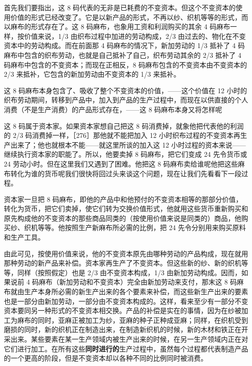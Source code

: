 首先我们要指出，这 8 码代表的无非是已耗费的不变资本。但这个不变资本的使用价值的形式已经改变了。它是以新产品的形式，不再以纱、织机等等的形式，而以麻布的形式存在了。这 8 码麻布，也象用工资和利润购买的其余 4 码麻布一样，按价值来说，1/3 由织布过程中加进的劳动构成，2/3 由过去的、物化在不变资本中的劳动构成。而在前面那 4 码麻布的情况下，新加劳动的 1/3 抵补了 4 码麻布中包含的织布劳动，也就是自己抵补了自己，织布劳动其余的 2/3 抵补了 4 码麻布中包含的不变资本；而现在正相反，8 码麻布包含的不变资本由不变资本的 2/3 来抵补，它包含的新加劳动由不变资本的 1/3 来抵补。

这 8 码麻布本身包含了、吸收了整个不变资本的价值，——这个价值在 12 小时的织布劳动期间，转移到产品中，加入到产品的生产过程中，而现在以供直接的个人消费（不是生产消费）的产品形式存在，——这 8 码麻布本身又将怎样呢

这 8 码属于资本家。如果资本家想自己把这 8 码消费掉，就象他把代表他的利润的 2/3 码消费掉一样，［276］那他就不能把加入 12 小时织布过程的不变资本再生产出来了；他也就根本不能——就这里所谈的加入这 12 小时过程的资本来说——继续执行资本家的职能了。所以，他要卖掉 8 码麻布，把它们变成 24 先令货币或 24 劳动小时。但在这里我们又遇到了困难。他把这 8 码麻布卖给谁呢他把这些麻布转化为谁的货币呢我们很快将回过头来谈这个问题，现在让我们先看看下一段过程。

资本家一旦把 8 码麻布，即他的产品中和他预付的不变资本相等的那部分价值，转化为货币，把它们卖掉，使它们转为交换价值形式，他就用这些货币重新购买和原先构成他的不变资本的那些商品同类的（按使用价值来说是同类的）商品，他购买纱、织机等等。他按照生产新麻布所必需的比例，把 24 先令分别用来购买原料和生产工具。

由此可见，按使用价值来说，他的不变资本原先由哪种劳动的产品构成，现在就用那种劳动的新产品来补偿。资本家再生产了不变资本。但这些新的纱、新的织机等等，同样（按照假定）也是 2/3 由不变资本构成，1/3 由新加劳动构成。因而，如果说前 4 码麻布（新加劳动和不变资本）完全由新加劳动来支付，那末这 8 码麻布就由生产本身所必需的新生产出来的各个要素来补偿，而这些新生产出来的要素也是一部分由新加劳动，一部分由不变资本构成的。这样，看来至少有一部分不变资本要同另一种形式的不变资本相交换。产品的补偿是实在的事情，因为在纱被加工为麻布的同时，亚麻正被加工为纱，亚麻的种子正种成亚麻；同样，在织机受到磨损的同时，新的织机正在制造出来，在制造新织机的时候，新的木材和铁正在开采出来。某些要素在某一生产领域内被生产出来的时候，在另一生产领域内正在对它们进行加工。在所有这些\textbf{同时进行的}生产过程中，虽然每个过程都代表制造产品的一个更高的阶段，但是不变资本却以各种不同的比例同时被消费。


